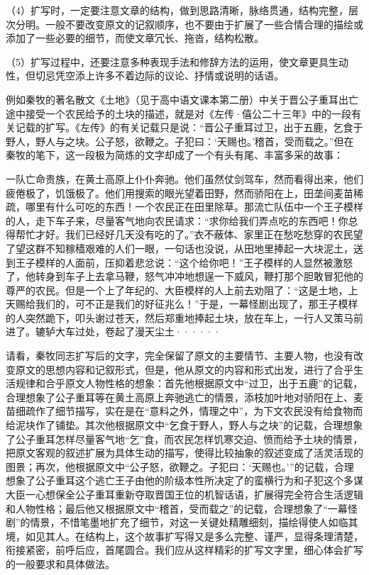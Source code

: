 （4）扩写时，一定要注意文章的结构，做到思路清晰，脉络贯通，结构完整，层次分明。一般不要改变原文的记叙顺序，也不要由于扩展了一些合情合理的描绘或添加了一些必要的细节，而使文章冗长、拖沓，结构松散。

（5）扩写过程中，还要注意多种表现手法和修辞方法的运用，使文章更具生动性，但切忌凭空添上许多不着边际的议论、抒情或说明的话语。

例如秦牧的著名散文《土地》（见于高中语文课本第二册）中关于晋公子重耳出亡途中接受一个农民给予的土块的描述，就是对《左传·僖公二十三年》中的一段有关记载的扩写。《左传》的有关记载只是说：“晋公子重耳过卫，出于五鹿，乞食于野人，野人与之块。公子怒，欲鞭之。子犯曰：‘天赐也。’稽首，受而载之。”但在秦牧的笔下，这一段极为简炼的文字却成了一个有头有尾、丰富多采的故事：

一队亡命贵族，在黄土高原上仆仆奔驰。他们虽然仗剑驾车，然而看得出来，他们疲倦极了，饥饿极了。他们用搜索的眼光望着田野，然而骄阳在上，田垄间麦苗稀疏，哪里有什么可吃的东西！一个农民正在田里除草。那流亡队伍中一个王子模样的人，走下车子来，尽量客气地向农民请求：“求你给我们弄点吃的东西吧！你总得帮忙才好。我们已经好几天没有吃的了。”衣不蔽体、家里正在愁吃愁穿的农民望了望这群不知稼穑艰难的人们一眼，一句话也没说，从田地里捧起一大块泥土，送到王子模样的人面前，压抑着悲忿说：“这个给你吧！”王子模样的人显然被激怒了，他转身到车子上去拿马鞭，怒气冲冲地想逞一下威风，鞭打那个胆敢冒犯他的尊严的农民。但是一个上了年纪的、大臣模样的人上前去劝阻了：“这是土地，上天赐给我们的，可不正是我们的好征兆么！”于是，一幕怪剧出现了，那王子模样的人突然跪下，叩头谢过苍天，然后郑重地捧起土块，放在车上，一行人又策马前进了。辘轳大车过处，卷起了漫天尘土······

请看，秦牧同志扩写后的文字，完全保留了原文的主要情节、主要人物，也没有改变原文的思想内容和记叙形式，但是，他从原文的内容和形式出发，进行了合乎生活规律和合乎原文人物性格的想象：首先他根据原文中“过卫，出于五鹿”的记载，合理想象了公子重耳等在黄土高原上奔驰逃亡的情景，添枝加叶地对骄阳在上、麦苗细疏作了细节描写，实在是在“意料之外，情理之中”，为下文农民没有给食物而给泥块作了铺垫。其次他根据原文中“乞食于野人，野人与之块”的记载，合理想象了公子重耳怎样尽量客气地“乞”食，而农民怎样饥寒交迫、愤而给予土块的情景，把原文客观的叙述扩展为具体生动的描写，使得比较抽象的叙述变成了活灵活现的图景；再次，他根据原文中“公子怒，欲鞭之。子犯曰：‘天赐也。’”的记载，合理想象了公子重耳这个逃亡王子由他的阶级本性所决定了的蛮横行为和子犯这个多谋大臣一心想保全公子重耳重新夺取晋国王位的机智话语，扩展得完全符合生活逻辑和人物性格；最后他又根据原文中“稽首，受而载之”的记载，合理想象了“一幕怪剧”的情景，不惜笔墨地扩充了细节，对这一关键处精雕细刻，描绘得使人如临其境，如见其人。在结构上，这个故事扩写得又是多么完整、谨严，显得条理清楚，衔接紧密，前呼后应，首尾圆合。我们应从这样精彩的扩写文字里，细心体会扩写的一般要求和具体做法。

